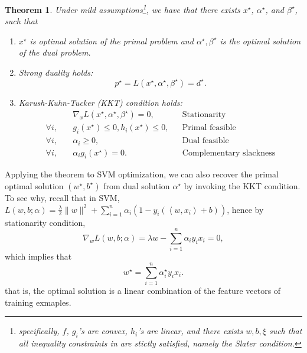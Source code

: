 \documentclass{article}
\newtheorem{theorem}{Theorem}
\newcommand{\inner}[2]{\left\langle #1,#2 \right\rangle}
\begin{document}
\begin{theorem}
  Under mild assumptions\footnote{specifically, $f$, $g_i$'s are convex, $h_i$'s are linear, and there exists $w,b,\xi$ such that all inequality constraints in are stictly satisfied, namely the Slater condition.}, we have that there exists $x^\star$, $\alpha^\star$, and $\beta^\star$, such that
  \begin{enumerate}
  \item $x^\star$ is optimal solution of the primal problem and $\alpha^\star, \beta^\star$ is the optimal solution of the dual problem.
  \item Strong duality holds:
  \[ p^\star = L(x^\star, \alpha^\star, \beta^\star) = d^\star. \]
  \item Karush-Kuhn-Tucker (KKT) condition holds:
  \begin{align*}
    &\nabla_x L(x^\star,\alpha^\star,\beta^\star) = 0, && \text{Stationarity}\\
    \forall i, \quad &g_i(x^\star) \leq 0, h_i(x^\star) \leq 0, && \text{Primal feasible} \\
    \forall i, \quad &\alpha_i \geq 0, && \text{Dual feasible} \\
    \forall i, \quad &\alpha_i g_i(x^\star) = 0. && \text{Complementary slackness}
  \end{align*}
\end{enumerate}
\end{theorem}

Applying the theorem to SVM optimization, we can also recover the primal optimal solution $(w^\star, b^\star)$ from dual solution $\alpha^\star$ by invoking the KKT condition. To see why, recall that in SVM, $L(w,b;\alpha) = \frac \lambda 2 \| w \|^2 + \sum_{i=1}^n \alpha_i (1 - y_i(\inner{w}{x_i} + b))$, hence by stationarity condition,
\[ \nabla_w L(w,b;\alpha) = \lambda w - \sum_{i=1}^n \alpha_i y_i x_i = 0, \]
which implies that
\[ w^\star = \sum_{i=1}^n \alpha_i^\star y_i x_i. \]
that is, the optimal solution is a linear combination of the feature vectors of training exmaples.
\end{document}
